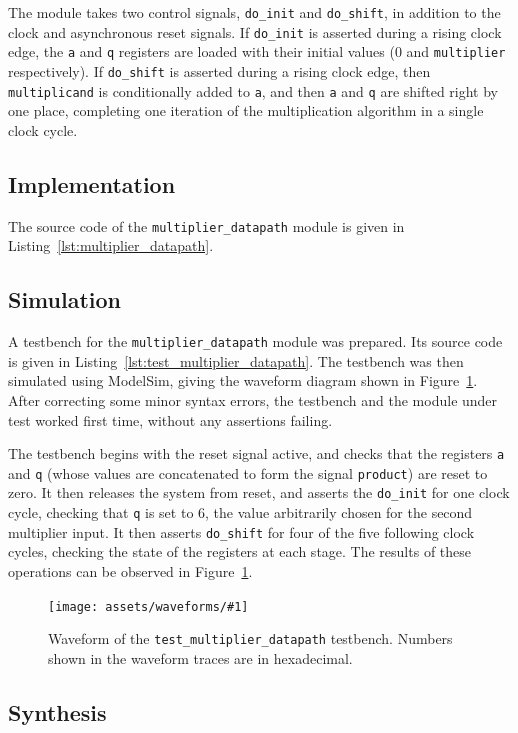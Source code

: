 \documentclass[a4paper]{article}
\newcommand{\waveformfigure}[2]{
  \begin{figure}[tp]
    \centering\texttt{[image: assets/waveforms/\#1]}
    \caption{#2}
    \label{fig:wave:#1}
  \end{figure}
}
\begin{document}
The module takes two control signals, \texttt{do\_init} and \texttt{do\_shift}, in addition to the clock and asynchronous reset signals. If \texttt{do\_init} is asserted during a rising clock edge, the \texttt{a} and \texttt{q} registers are loaded with their initial values (0 and \texttt{multiplier} respectively). If \texttt{do\_shift} is asserted during a rising clock edge, then \texttt{multiplicand} is conditionally added to \texttt{a}, and then \texttt{a} and \texttt{q} are shifted right by one place, completing one iteration of the multiplication algorithm in a single clock cycle.

\subsection{Implementation}
\label{sec:reg:impl}

The source code of the \texttt{multiplier\_datapath} module is given in Listing~\ref{lst:multiplier_datapath}.

\subsection{Simulation}
\label{sec:reg:sim}

A testbench for the \texttt{multiplier\_datapath} module was prepared. Its source code is given in Listing~\ref{lst:test_multiplier_datapath}. The testbench was then simulated using ModelSim, giving the waveform diagram shown in Figure~\ref{fig:wave:test_multiplier_datapath}. After correcting some minor syntax errors, the testbench and the module under test worked first time, without any assertions failing.

The testbench begins with the reset signal active, and checks that the registers \texttt{a} and \texttt{q} (whose values are concatenated to form the signal \texttt{product}) are reset to zero. It then releases the system from reset, and asserts the \texttt{do\_init} for one clock cycle, checking that \texttt{q} is set to 6, the value arbitrarily chosen for the second multiplier input. It then asserts \texttt{do\_shift} for four of the five following clock cycles, checking the state of the registers at each stage. The results of these operations can be observed in Figure~\ref{fig:wave:test_multiplier_datapath}.

\waveformfigure{test_multiplier_datapath}{Waveform of the \texttt{test\_multiplier\_datapath} testbench. Numbers shown in the waveform traces are in hexadecimal.}

\subsection{Synthesis}
\label{sec:reg:synth}
\end{document}
